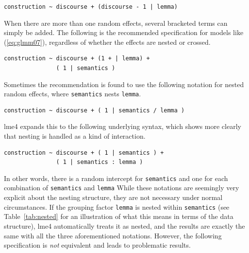 \documentclass[a4paper,12pt]{article}
\begin{document}
\vspace{0.5\baselineskip}

\begin{lstlisting}[frame=trbl]
construction ~ discourse + (discourse - 1 | lemma)
\end{lstlisting}

When there are more than one random effects, several bracketed terms can simply be added.
The following is the recommended specification for models like (\ref{eq:glmm07}), regardless of whether the effects are nested or crossed.

\vspace{0.5\baselineskip}

\begin{lstlisting}[frame=trbl]
construction ~ discourse + (1 + | lemma) +
               ( 1 | semantics )
\end{lstlisting}

Sometimes the recommendation is found to use the following notation for nested random effects, where \texttt{semantics} nests \texttt{lemma}.

\vspace{0.5\baselineskip}

\begin{lstlisting}[frame=trbl]
construction ~ discourse + ( 1 | semantics / lemma )
\end{lstlisting}

lme4 expands this to the following underlying syntax, which shows more clearly that nesting is handled as a kind of interaction.

\vspace{0.5\baselineskip}

\begin{lstlisting}[frame=trbl]
construction ~ discourse + ( 1 | semantics ) +
               ( 1 | semantics : lemma )
\end{lstlisting}

In other words, there is a random intercept for \texttt{semantics} and one for each combination of \texttt{semantics} and \texttt{lemma}
While these notations are seemingly very explicit about the nesting structure, they are not necessary under normal circumstances.
If the grouping factor \texttt{lemma} is nested within \texttt{semantics} (see Table~\ref{tab:nested} for an illustration of what this means in terms of the data structure), lme4 automatically treats it as nested, and the results are exactly the same with all the three aforementioned notations.
However, the following specification is \textit{not} equivalent and leads to problematic results.
\end{document}
